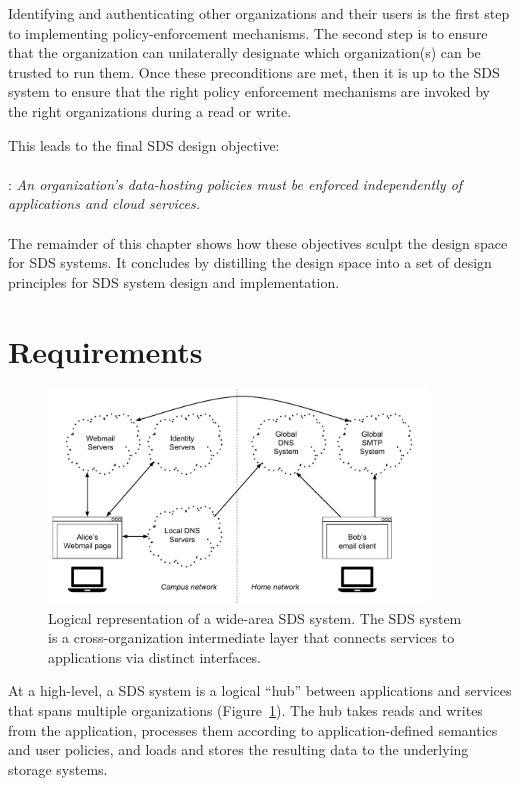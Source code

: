 Identifying and authenticating other organizations and their users
is the first step to implementing policy-enforcement mechanisms.
The second step is to ensure that the organization can unilaterally
designate which organization(s) can be trusted to run them.
Once these preconditions are met, then it is up to the SDS system to ensure that the right
policy enforcement mechanisms are invoked by the right organizations during a read or write.

This leads to the final SDS design objective:
\\
\\
: \emph{An organization's data-hosting policies
must be enforced independently of applications and cloud services.}
\\
\\
The remainder of this chapter shows how these objectives sculpt the design space
for SDS systems.  It concludes by distilling the design space into a set of
design principles for SDS system design and implementation.

\section{Requirements}

\begin{figure}[h]
   \centering
   \includegraphics[width=0.9\textwidth,page=2]{figures/dissertation-figures}
   \caption{Logical representation of a wide-area SDS system.  The SDS system
   is a cross-organization intermediate layer that connects services to
   applications via distinct interfaces.}
   \label{fig:chap2-sds-overview}
\end{figure}

At a high-level, a SDS system is a logical ``hub'' between applications and
services that spans multiple organizations (Figure~\ref{fig:chap2-sds-overview}). 
The hub takes reads and writes from the application, processes them
according to application-defined semantics and user policies, and loads and stores the resulting
data to the underlying storage systems.

